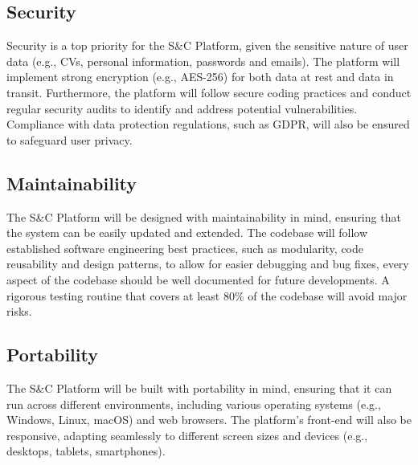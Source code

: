 \subsection{Security}
Security is a top priority for the S\&C Platform, 
given the sensitive nature of user data (e.g., CVs, personal information, passwords and emails). 
The platform will implement strong encryption (e.g., AES-256) 
for both data at rest and data in transit. 
Furthermore, the platform will follow secure coding practices 
and conduct regular security audits to identify and address potential vulnerabilities. 
Compliance with data protection regulations, such as GDPR, will also be ensured to safeguard user privacy.

\subsection{Maintainability}
The S\&C Platform will be designed with maintainability in mind, 
ensuring that the system can be easily updated and extended. 
The codebase will follow established software engineering best practices, 
such as modularity, code reusability and design patterns, to allow for easier debugging and bug fixes, 
every aspect of the codebase should be well documented for future developments.  
A rigorous testing routine that covers at least 80\% of the codebase will avoid major risks.

\subsection{Portability}
The S\&C Platform will be built with portability in mind, 
ensuring that it can run across different environments, 
including various operating systems (e.g., Windows, Linux, macOS) and web browsers. 
The platform’s front-end will also be responsive, 
adapting seamlessly to different screen sizes and devices (e.g., desktops, tablets, smartphones).
